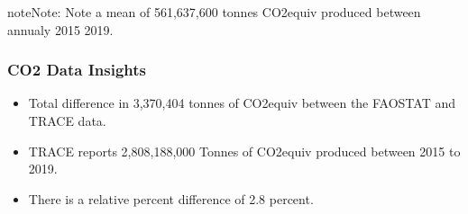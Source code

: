 \documentclass[letterpaper,10pt,english]{jupyterBook}
\begin{document}
\begin{sphinxadmonition}{note}{Note:}
\sphinxAtStartPar
Note a mean of 561,637,600 tonnes CO2equiv produced between annualy 2015 \sphinxhyphen{} 2019.
\end{sphinxadmonition}


\subsubsection{CO2 Data Insights}
\label{\detokenize{notebooks/full_post:co2-data-insights}}\begin{itemize}
\item {} 
\sphinxAtStartPar
Total difference in 3,370,404 tonnes of CO2equiv between the FAOSTAT and TRACE data.

\item {} 
\sphinxAtStartPar
TRACE reports 2,808,188,000 Tonnes of CO2equiv produced between 2015 to 2019.

\item {} 
\sphinxAtStartPar
There is a relative percent difference of \sphinxhyphen{}2.8 percent.

\end{itemize}
\end{document}
